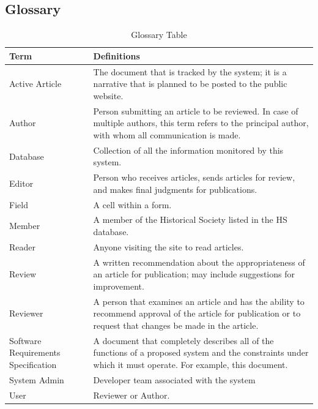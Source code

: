 \begin{appendices}
\chapter{Glossary}


\begin{center}
\setlength{\tabcolsep}{1.0cm}
\renewcommand{\arraystretch}{1.5}
    \begin{table}[ht]
        \centering
        \begin{tabular}{|m{60pt}|p{9cm}|}
            \hline
                \textbf{Term} &  \textbf{Definitions} \\
            \hline
                Active Article  &  The document that is tracked by the system; it is a narrative that is planned to be posted to the public website.\\
            \hline
                Author & Person submitting an article to be reviewed. In case of multiple authors, this term refers to the principal author, with whom all communication is made.\\
            \hline
             	Database &  Collection of all the information monitored by this system.\\
            \hline
            	 Editor &  Person who receives articles, sends articles for review, and makes final judgments for publications.\\
            \hline
             	Field &  A cell within a form. \\
            \hline
            	Member &  A member of the Historical Society listed in the HS database. \\
            \hline
           	 	Reader &  Anyone visiting the site to read articles.\\
            \hline
            	Review & A written recommendation about the appropriateness of an article for publication; may include suggestions for improvement. \\
            \hline
            	Reviewer &  A person that examines an article and has the ability to recommend approval of the article for publication or to request that changes be made in the article. \\
            \hline
            	Software Requirements Specification &  A document that completely describes all of the functions of a proposed system and the constraints under which it must operate. For example, this document. \\
            \hline
            	System Admin & Developer team associated with the system \\
                \hline
            User &  Reviewer or Author. \\
            \hline
        \end{tabular}
        \caption{Glossary Table}
        \label{tab:my_label}
    \end{table}
\end{center}





\end{appendices}

